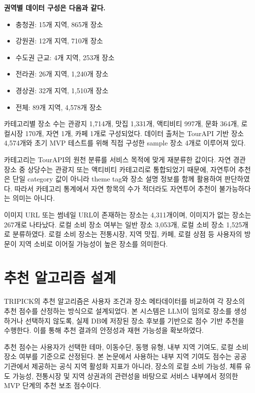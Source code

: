 \documentclass[10pt,a4paper]{article}
\begin{document}
\noindent
\textbf{권역별 데이터 구성은 다음과 같다.}

\begin{itemize}[leftmargin=2em]
\item 충청권: 15개 지역, 865개 장소
\item 강원권: 12개 지역, 710개 장소
\item 수도권 근교: 4개 지역, 253개 장소
\item 전라권: 26개 지역, 1,240개 장소
\item 경상권: 32개 지역, 1,510개 장소
\item 전체: 89개 지역, 4,578개 장소
\end{itemize}

카테고리별 장소 수는 관광지 1,714개, 맛집 1,331개, 액티비티 997개, 문화 364개, 로컬시장 170개, 자연 1개, 카페 1개로 구성되었다. 데이터 출처는 TourAPI 기반 장소 4,574개와 초기 MVP 테스트를 위해 직접 구성한 sample 장소 4개로 이루어져 있다.

카테고리는 TourAPI의 원천 분류를 서비스 목적에 맞게 재분류한 값이다. 자연 경관 장소 중 상당수는 관광지 또는 액티비티 카테고리로 통합되었기 때문에, 자연투어 추천은 단일 category 값이 아니라 theme tag와 장소 설명 정보를 함께 활용하여 판단하였다. 따라서 카테고리 통계에서 자연 항목의 수가 적더라도 자연투어 추천이 불가능하다는 의미는 아니다.

이미지 URL 또는 썸네일 URL이 존재하는 장소는 4,311개이며, 이미지가 없는 장소는 267개로 나타났다. 로컬 소비 장소 여부는 일반 장소 3,053개, 로컬 소비 장소 1,525개로 분류하였다. 로컬 소비 장소는 전통시장, 지역 맛집, 카페, 로컬 상점 등 사용자의 방문이 지역 소비로 이어질 가능성이 높은 장소를 의미한다.

\section{추천 알고리즘 설계}

TRIPICK의 추천 알고리즘은 사용자 조건과 장소 메타데이터를 비교하여 각 장소의 추천 점수를 산정하는 방식으로 설계되었다. 본 시스템은 LLM이 임의로 장소를 생성하거나 선택하지 않도록, 실제 DB에 저장된 장소 후보를 기반으로 점수 기반 추천을 수행한다. 이를 통해 추천 결과의 안정성과 재현 가능성을 확보하였다.

추천 점수는 사용자가 선택한 테마, 이동수단, 동행 유형, 내부 지역 기여도, 로컬 소비 장소 여부를 기준으로 산정된다. 본 논문에서 사용하는 내부 지역 기여도 점수는 공공기관에서 제공하는 공식 지역 활성화 지표가 아니라, 장소의 로컬 소비 가능성, 체류 유도 가능성, 전통시장 및 지역 상권과의 관련성을 바탕으로 서비스 내부에서 정의한 MVP 단계의 추천 보조 점수이다.
\end{document}
